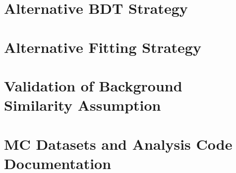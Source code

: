 \documentclass[UKenglish,texlive=2013]{\ATLASLATEXPATH atlasdoc}
\begin{document}
\clearpage
\clearpage
\section{Alternative BDT Strategy}
\label{sec:app-oldbdtregions}


\clearpage
\section{Alternative Fitting Strategy}
\label{sec:app-oldfitbkgds}


\clearpage
\section{Validation of Background Similarity Assumption}
\label{sec:app-LinearityTest}



\clearpage
\section{MC Datasets and Analysis Code Documentation}
\label{sec:app-code}






\printbibliography
%
%

\clearpage
{}
\end{document}
